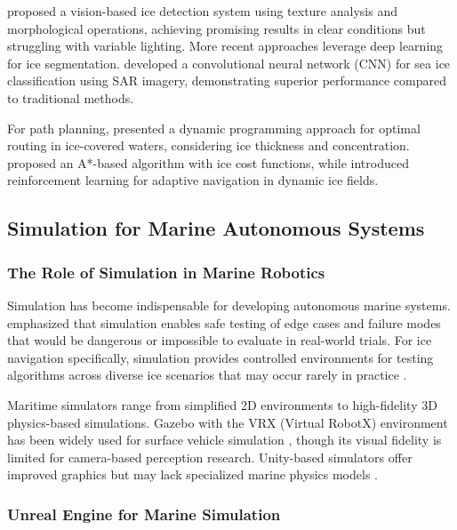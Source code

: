 \citeauthor{kim2015sea} proposed a vision-based ice detection system using texture analysis and morphological operations, achieving promising results in clear conditions but struggling with variable lighting. More recent approaches leverage deep learning for ice segmentation. \citeauthor{choi2021ship} developed a convolutional neural network (CNN) for sea ice classification using SAR imagery, demonstrating superior performance compared to traditional methods.

For path planning, \citeauthor{zaccone2018optimal} presented a dynamic programming approach for optimal routing in ice-covered waters, considering ice thickness and concentration. \citeauthor{zhang2019path} proposed an A*-based algorithm with ice cost functions, while \citeauthor{li2021dynamic} introduced reinforcement learning for adaptive navigation in dynamic ice fields.

\subsection{Simulation for Marine Autonomous Systems}

\subsubsection{The Role of Simulation in Marine Robotics}

Simulation has become indispensable for developing autonomous marine systems. \citeauthor{parasuraman2022simulation} emphasized that simulation enables safe testing of edge cases and failure modes that would be dangerous or impossible to evaluate in real-world trials. For ice navigation specifically, simulation provides controlled environments for testing algorithms across diverse ice scenarios that may occur rarely in practice \parencite{zhang2021polar}.

Maritime simulators range from simplified 2D environments to high-fidelity 3D physics-based simulations. Gazebo with the VRX (Virtual RobotX) environment has been widely used for surface vehicle simulation \parencite{bingham2019virtual}, though its visual fidelity is limited for camera-based perception research. Unity-based simulators offer improved graphics but may lack specialized marine physics models \parencite{shah2018airsim}.

\subsubsection{Unreal Engine for Marine Simulation}

